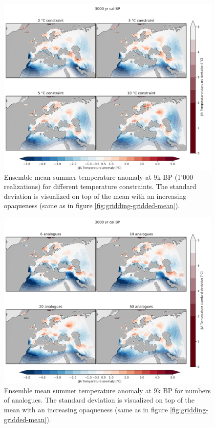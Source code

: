 \begin{refsection}
\begin{figure}
	\includegraphics[width=\linewidth,page=3]{gridding-figures/temperature-means-per-thresh.pdf}
	\caption[Impact of climate constraint on gridded results]{Ensemble mean summer temperature anomaly at 9k BP (1'000 realizations) for different temperature constraints. The standard deviation is visualized on top of the mean with an increasing opaqueness (same as in figure \ref{fig:gridding-gridded-mean}).}
	\label{fig:gridding-gridded-climate-constraint}
\end{figure}

\begin{figure}
	\includegraphics[width=\linewidth,page=3]{gridding-figures/temperature-means-per-k.pdf}
	\caption[Impact of the number of analogues on the gridded results]{Ensemble mean summer temperature anomaly at 9k BP for numbers of analogues. The standard deviation is visualized on top of the mean with an increasing opaqueness (same as in figure \ref{fig:gridding-gridded-mean}).}
	\label{fig:gridding-gridded-k}
\end{figure}


\end{refsection}
